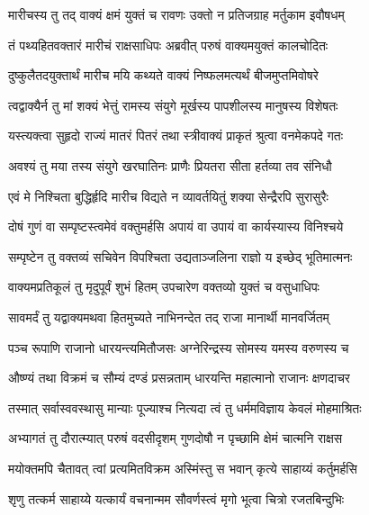 
\twolineshloka
{मारीचस्य तु तद् वाक्यं क्षमं युक्तं च रावणः}
{उक्तो न प्रतिजग्राह मर्तुकाम इवौषधम्} %

\twolineshloka
{तं पथ्यहितवक्तारं मारीचं राक्षसाधिपः}
{अब्रवीत् परुषं वाक्यमयुक्तं कालचोदितः} %

\twolineshloka
{दुष्कुलैतदयुक्तार्थं मारीच मयि कथ्यते}
{वाक्यं निष्फलमत्यर्थं बीजमुप्तमिवोषरे} %

\twolineshloka
{त्वद्वाक्यैर्न तु मां शक्यं भेत्तुं रामस्य संयुगे}
{मूर्खस्य पापशीलस्य मानुषस्य विशेषतः} %

\twolineshloka
{यस्त्यक्त्वा सुहृदो राज्यं मातरं पितरं तथा}
{स्त्रीवाक्यं प्राकृतं श्रुत्वा वनमेकपदे गतः} %

\twolineshloka
{अवश्यं तु मया तस्य संयुगे खरघातिनः}
{प्राणैः प्रियतरा सीता हर्तव्या तव संनिधौ} %

\twolineshloka
{एवं मे निश्चिता बुद्धिर्हृदि मारीच विद्यते}
{न व्यावर्तयितुं शक्या सेन्द्रैरपि सुरासुरैः} %

\twolineshloka
{दोषं गुणं वा सम्पृष्टस्त्वमेवं वक्तुमर्हसि}
{अपायं वा उपायं वा कार्यस्यास्य विनिश्चये} %

\twolineshloka
{सम्पृष्टेन तु वक्तव्यं सचिवेन विपश्चिता}
{उद्यताञ्जलिना राज्ञो य इच्छेद् भूतिमात्मनः} %

\twolineshloka
{वाक्यमप्रतिकूलं तु मृदुपूर्वं शुभं हितम्}
{उपचारेण वक्तव्यो युक्तं च वसुधाधिपः} %

\twolineshloka
{सावमर्दं तु यद्वाक्यमथवा हितमुच्यते}
{नाभिनन्देत तद् राजा मानार्थी मानवर्जितम्} %

\twolineshloka
{पञ्च रूपाणि राजानो धारयन्त्यमितौजसः}
{अग्नेरिन्द्रस्य सोमस्य यमस्य वरुणस्य च} %

\twolineshloka
{औष्ण्यं तथा विक्रमं च सौम्यं दण्डं प्रसन्नताम्}
{धारयन्ति महात्मानो राजानः क्षणदाचर} %

\twolineshloka
{तस्मात् सर्वास्ववस्थासु मान्याः पूज्याश्च नित्यदा}
{त्वं तु धर्ममविज्ञाय केवलं मोहमाश्रितः} %

\twolineshloka
{अभ्यागतं तु दौरात्म्यात् परुषं वदसीदृशम्}
{गुणदोषौ न पृच्छामि क्षेमं चात्मनि राक्षस} %

\twolineshloka
{मयोक्तमपि चैतावत् त्वां प्रत्यमितविक्रम}
{अस्मिंस्तु स भवान् कृत्ये साहाय्यं कर्तुमर्हसि} %

\twolineshloka
{शृणु तत्कर्म साहाय्ये यत्कार्यं वचनान्मम}
{सौवर्णस्त्वं मृगो भूत्वा चित्रो रजतबिन्दुभिः} %

